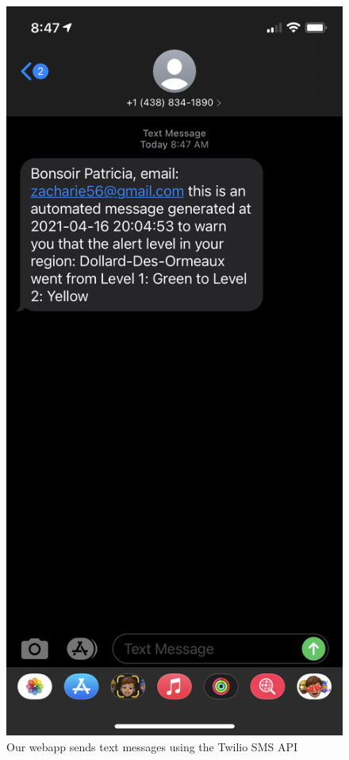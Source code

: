 \documentclass{article}
\begin{document}
\begin{figure}[h]
    \centering
    \includegraphics[scale=0.15]{imgs/sms.png}
    \caption{Our webapp sends text messages using the Twilio SMS API}
\end{figure}
\clearpage
\end{document}

